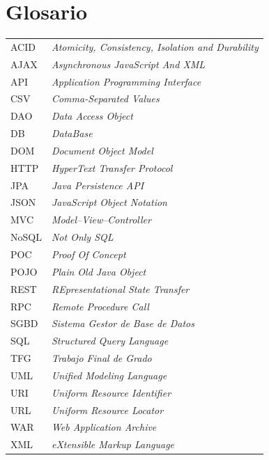 \documentclass[11pt,a4paper]{article}
\begin{document}
\begin{itemize}
\end{itemize}
\newpage 


\section{Glosario} 
\begin{table}[H]
\begin{tabular}{ll}
ACID & \textit{Atomicity, Consistency, Isolation and Durability}                  \\
AJAX & \textit{Asynchronous JavaScript And XML}                  \\
API & \textit{Application Programming Interface}                  \\
CSV & \textit{Comma-Separated Values}                  \\
DAO & \textit{Data Access Object}                  \\
DB & \textit{DataBase}                  \\
DOM & \textit{Document Object Model}                  \\
HTTP & \textit{HyperText Transfer Protocol}                  \\
JPA & \textit{Java Persistence API}                  \\
JSON & \textit{JavaScript Object Notation}                  \\
MVC & \textit{Model–View–Controller}                  \\
NoSQL & \textit{Not Only SQL}                  \\
POC & \textit{Proof Of Concept}                  \\
POJO & \textit{Plain Old Java Object}                  \\
REST & \textit{REpresentational State Transfer}                  \\
RPC & \textit{Remote Procedure Call}                  \\
SGBD & \textit{Sistema Gestor de Base de Datos}                  \\
SQL & \textit{Structured Query Language}                  \\
TFG & \textit{Trabajo Final de Grado}                  \\
UML & \textit{Unified Modeling Language}                  \\
URI & \textit{Uniform Resource Identifier}                  \\
URL & \textit{Uniform Resource Locator}                  \\
WAR & \textit{Web Application Archive}                  \\
XML & \textit{eXtensible Markup Language}
\end{tabular}%
\end{table}
\newpage 
\end{document}

